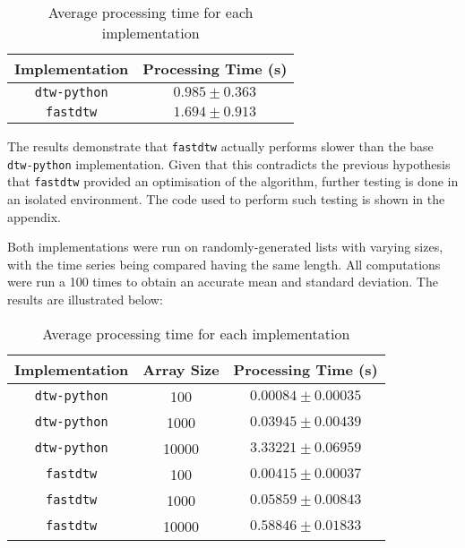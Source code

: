 \documentclass[final,rdr32.tex]{subfiles}
\begin{document}
\begin{table}[H]
    \begin{center}
        \begin{tabular}{ |c|c| }
            \hline
            Implementation    & Processing Time (s) \\
            \hline
            \verb|dtw-python| & $0.985 \pm 0.363$   \\
            \verb|fastdtw|    & $1.694 \pm 0.913$   \\
            \hline
        \end{tabular}
    \end{center}
    \caption{Average processing time for each implementation}
    \label{tab:time}
\end{table}

The results demonstrate that \verb|fastdtw| actually performs slower than the base \\ \verb|dtw-python| implementation. Given that this contradicts the previous hypothesis that \verb|fastdtw| provided an optimisation of the algorithm, further testing is done in an isolated environment. The code used to perform such testing is shown in the appendix.

Both implementations were run on randomly-generated lists with varying sizes, with the time series being compared having the same length. All computations were run a 100 times to obtain an accurate mean and standard deviation. The results are illustrated below:

\begin{table}[H]
    \begin{center}
        \begin{tabular}{ |c|c|c| }
            \hline
            Implementation    & Array Size & Processing Time (s)   \\
            \hline
            \verb|dtw-python| & 100        & $0.00084 \pm 0.00035$ \\
            \verb|dtw-python| & 1000       & $0.03945 \pm 0.00439$ \\
            \verb|dtw-python| & 10000      & $3.33221 \pm 0.06959$ \\
            \verb|fastdtw|    & 100        & $0.00415 \pm 0.00037$ \\
            \verb|fastdtw|    & 1000       & $0.05859 \pm 0.00843$ \\
            \verb|fastdtw|    & 10000      & $0.58846 \pm 0.01833$ \\
            \hline
        \end{tabular}
    \end{center}
    \caption{Average processing time for each implementation}
    \label{tab:performance}
\end{table}
\end{document}
